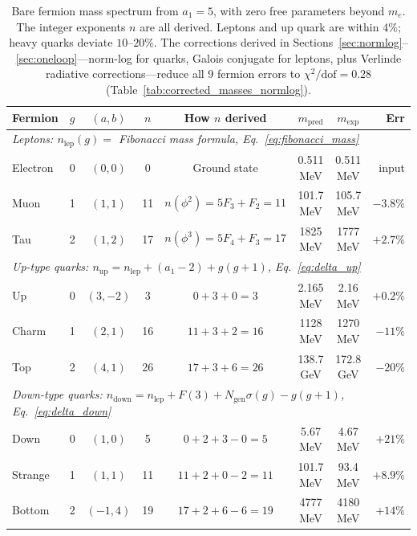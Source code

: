\documentclass[12pt,a4paper]{article}
\theoremstyle{definition}
\begin{document}
\begin{table}[H]
\centering
\begin{tabular}{lccccccr}
\toprule
\textbf{Fermion} & $g$ & $(a,b)$ & $n$ & \textbf{How $n$ derived} & $m_{\text{pred}}$ & $m_{\text{exp}}$ & \textbf{Err} \\
\midrule
\multicolumn{8}{l}{\textit{Leptons: $n_{\text{lep}}(g) = $ Fibonacci mass formula, Eq.~\eqref{eq:fibonacci_mass}}} \\
Electron & 0 & $(0,0)$ & 0 & Ground state & 0.511 MeV & 0.511 MeV & input \\
Muon & 1 & $(1,1)$ & 11 & $n(\phi^2) = 5F_3 + F_2 = 11$ & 101.7 MeV & 105.7 MeV & $-3.8\%$ \\
Tau & 2 & $(1,2)$ & 17 & $n(\phi^3) = 5F_4 + F_3 = 17$ & 1825 MeV & 1777 MeV & $+2.7\%$ \\
\midrule
\multicolumn{8}{l}{\textit{Up-type quarks: $n_{\text{up}} = n_{\text{lep}} + (a_1-2) + g(g+1)$, Eq.~\eqref{eq:delta_up}}} \\
Up & 0 & $(3,-2)$ & 3 & $0 + 3 + 0 = 3$ & 2.165 MeV & 2.16 MeV & $+0.2\%$ \\
Charm & 1 & $(2,1)$ & 16 & $11 + 3 + 2 = 16$ & 1128 MeV & 1270 MeV & $-11\%$ \\
Top & 2 & $(4,1)$ & 26 & $17 + 3 + 6 = 26$ & 138.7 GeV & 172.8 GeV & $-20\%$ \\
\midrule
\multicolumn{8}{l}{\textit{Down-type quarks: $n_{\text{down}} = n_{\text{lep}} + F(3) + N_{\text{gen}}\sigma(g) - g(g+1)$, Eq.~\eqref{eq:delta_down}}} \\
Down & 0 & $(1,0)$ & 5 & $0 + 2 + 3 - 0 = 5$ & 5.67 MeV & 4.67 MeV & $+21\%$ \\
Strange & 1 & $(1,1)$ & 11 & $11 + 2 + 0 - 2 = 11$ & 101.7 MeV & 93.4 MeV & $+8.9\%$ \\
Bottom & 2 & $(-1,4)$ & 19 & $17 + 2 + 6 - 6 = 19$ & 4777 MeV & 4180 MeV & $+14\%$ \\
\bottomrule
\end{tabular}
\caption{Bare fermion mass spectrum from $a_1 = 5$, with zero free parameters beyond $m_e$. The integer exponents $n$ are all derived. Leptons and up quark are within $4\%$; heavy quarks deviate $10$--$20\%$. The corrections derived in Sections~\ref{sec:normlog}--\ref{sec:oneloop}---norm-log for quarks, Galois conjugate for leptons, plus Verlinde radiative corrections---reduce all 9 fermion errors to $\chi^2/\text{dof} = 0.28$ (Table~\ref{tab:corrected_masses_normlog}).}
\label{tab:masses}
\end{table}
\end{document}

